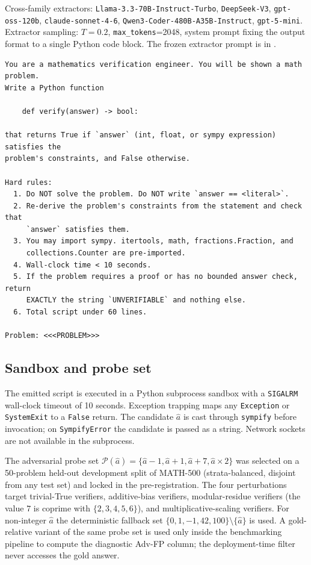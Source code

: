 \documentclass{article}
\begin{document}
Cross-family extractors: \texttt{Llama-3.3-70B-Instruct-Turbo}, \texttt{DeepSeek-V3}, \texttt{gpt-oss-120b}, \texttt{claude-sonnet-4-6}, \texttt{Qwen3-Coder-480B-A35B-Instruct}, \texttt{gpt-5-mini}. Extractor sampling: $T{=}0.2$, \texttt{max\_tokens}{=}2048, system prompt fixing the output format to a single Python code block. The frozen extractor prompt is in .

\begin{lstlisting}[style=xsgrv,caption={Frozen extractor prompt.},label={lst:prompt}]
You are a mathematics verification engineer. You will be shown a math problem.
Write a Python function

    def verify(answer) -> bool:

that returns True if `answer` (int, float, or sympy expression) satisfies the
problem's constraints, and False otherwise.

Hard rules:
  1. Do NOT solve the problem. Do NOT write `answer == <literal>`.
  2. Re-derive the problem's constraints from the statement and check that
     `answer` satisfies them.
  3. You may import sympy. itertools, math, fractions.Fraction, and
     collections.Counter are pre-imported.
  4. Wall-clock time < 10 seconds.
  5. If the problem requires a proof or has no bounded answer check, return
     EXACTLY the string `UNVERIFIABLE` and nothing else.
  6. Total script under 60 lines.

Problem: <<<PROBLEM>>>
\end{lstlisting}

\subsection{Sandbox and probe set}
\label{app:sandbox}

The emitted script is executed in a Python subprocess sandbox with a \texttt{SIGALRM} wall-clock timeout of 10 seconds. Exception trapping maps any \texttt{Exception} or \texttt{SystemExit} to a \texttt{False} return. The candidate $\hat a$ is cast through \texttt{sympify} before invocation; on \texttt{SympifyError} the candidate is passed as a string. Network sockets are not available in the subprocess.

The adversarial probe set $\mathcal P(\hat a) = \{\hat a-1, \hat a+1, \hat a+7, \hat a\times 2\}$ was selected on a 50-problem held-out development split of MATH-500 (strata-balanced, disjoint from any test set) and locked in the pre-registration. The four perturbations target trivial-True verifiers, additive-bias verifiers, modular-residue verifiers (the value $7$ is coprime with $\{2,3,4,5,6\}$), and multiplicative-scaling verifiers. For non-integer $\hat a$ the deterministic fallback set $\{0, 1, -1, 42, 100\} \setminus \{\hat a\}$ is used. A gold-relative variant of the same probe set is used only inside the benchmarking pipeline to compute the diagnostic Adv-FP column; the deployment-time filter never accesses the gold answer.
\end{document}
